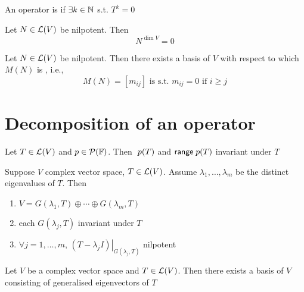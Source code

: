 \documentclass[aspectratio=169]{beamer}
\begin{document}
\begin{frame}
\begin{definition}
An operator is  if $\exists k\in\mathbb{N}$ s.t. $T^k=0$
\end{definition}
\vfill
\begin{importanttheorem}
Let $N\in\mathcal{L}(V)$ be nilpotent. Then
\[
N^{\dim V}=0
\]
\end{importanttheorem}
\vfill
\begin{importanttheorem}
Let $N\in\mathcal{L}(V)$ be nilpotent. Then there exists a basis of $V$ with respect to which $M(N)$ is , i.e., 
\[
M(N)=[m_{ij}]\textrm{ is s.t. }m_{ij}=0 \textrm{ if }i\geq j
\]
\end{importanttheorem}
\end{frame}


\section{Decomposition of an operator}

\begin{frame}
\begin{theorem}
Let $T\in\mathcal{L}(V)$ and $p\in\mathcal{P}(\mathbb{F})$. Then $\null\; p(T)$ and $\mathsf{range}\; p(T)$ invariant under $T$
\end{theorem}

\begin{importanttheorem}[Description of operators when $\IF=\IC$]
Suppose $V$ complex vector space, $T\in\mathcal{L}(V)$. Assume $\lambda_1,\ldots,\lambda_m$ be the distinct eigenvalues of $T$. Then
\begin{enumerate}
\item $V=G(\lambda_1,T)\oplus\cdots\oplus G(\lambda_m,T)$
\item each $G(\lambda_j,T)$ invariant under $T$
\item $\forall j=1,\ldots,m$, $\left.(T-\lambda_jI)\right|_{G(\lambda_j,T)}$ nilpotent
\end{enumerate}
\end{importanttheorem}

\begin{theorem}
Let $V$ be a complex vector space and $T\in\mathcal{L}(V)$. Then there exists a basis of $V$ consisting of generalised eigenvectors of $T$
\end{theorem}
\end{frame}
\end{document}
